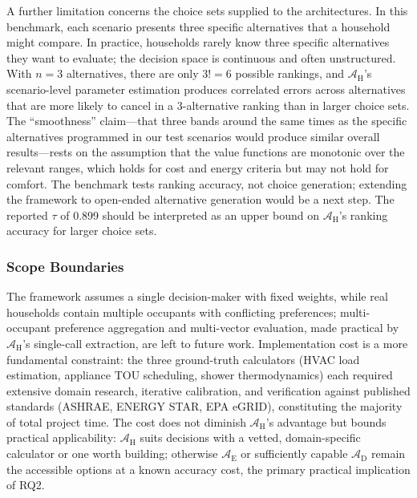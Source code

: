\documentclass[a4paper,fleqn]{cas-dc}
\begin{document}
A further limitation concerns the choice sets supplied to the architectures. In this benchmark, each scenario presents three specific alternatives that a household might compare. In practice, households rarely know three specific alternatives they want to evaluate; the decision space is continuous and often unstructured. With $n=3$ alternatives, there are only $3! = 6$ possible rankings, and $\mathcal{A}_{\text{H}}$'s scenario-level parameter estimation produces correlated errors across alternatives that are more likely to cancel in a 3-alternative ranking than in larger choice sets. The ``smoothness'' claim---that three bands around the same times as the specific alternatives programmed in our test scenarios would produce similar overall results---rests on the assumption that the value functions are monotonic over the relevant ranges, which holds for cost and energy criteria but may not hold for comfort. The benchmark tests ranking accuracy, not choice generation; extending the framework to open-ended alternative generation would be a next step. The reported $\tau$ of 0.899 should be interpreted as an upper bound on $\mathcal{A}_{\text{H}}$'s ranking accuracy for larger choice sets.

\subsubsection{Scope Boundaries}

The framework assumes a single decision-maker with fixed weights, while real households contain multiple occupants with conflicting preferences; multi-occupant preference aggregation \citep{keeneyraiffa1976} and multi-vector evaluation, made practical by $\mathcal{A}_{\text{H}}$'s single-call extraction, are left to future work. Implementation cost is a more fundamental constraint: the three ground-truth calculators (HVAC load estimation, appliance TOU scheduling, shower thermodynamics) each required extensive domain research, iterative calibration, and verification against published standards (ASHRAE, ENERGY STAR, EPA eGRID), constituting the majority of total project time. The cost does not diminish $\mathcal{A}_{\text{H}}$'s advantage but bounds practical applicability: $\mathcal{A}_{\text{H}}$ suits decisions with a vetted, domain-specific calculator or one worth building; otherwise $\mathcal{A}_{\text{E}}$ or sufficiently capable $\mathcal{A}_{\text{D}}$ remain the accessible options at a known accuracy cost, the primary practical implication of RQ2.
\end{document}
